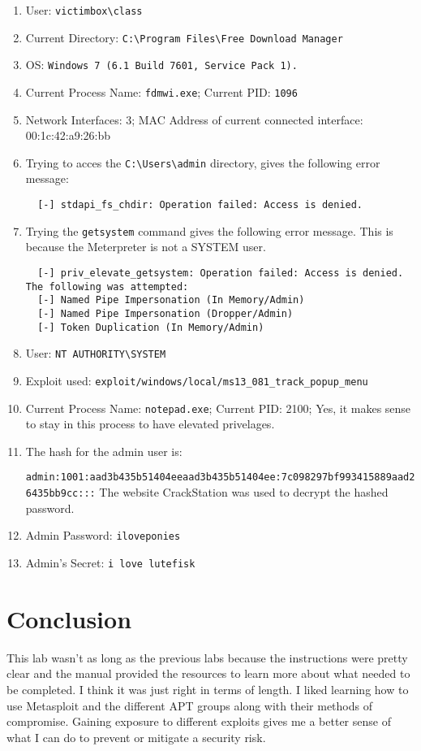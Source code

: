\documentclass[11pt]{article}
\begin{document}
\begin{enumerate}
  it does not require authentication, all system files are revealable, any file is modifiable, and
  the attacker can render the system unavailable.~\cite{cve}
  \item User: \verb|victimbox\class|
  \item Current Directory: \verb|C:\Program Files\Free Download Manager|
  \item OS: \verb|Windows 7 (6.1 Build 7601, Service Pack 1).|
  \item Current Process Name: \verb|fdmwi.exe|; Current PID: \verb|1096|
  \item Network Interfaces: 3; MAC Address of current connected interface: 00:1c:42:a9:26:bb
  \item Trying to acces the \verb|C:\Users\admin| directory, gives the following error message:
  \begin{verbatim}
  [-] stdapi_fs_chdir: Operation failed: Access is denied.
  \end{verbatim}
  \item Trying the \verb|getsystem| command gives the following error message. This is because the Meterpreter
  is not a SYSTEM user.
  \begin{verbatim}
  [-] priv_elevate_getsystem: Operation failed: Access is denied. The following was attempted:
  [-] Named Pipe Impersonation (In Memory/Admin)
  [-] Named Pipe Impersonation (Dropper/Admin)
  [-] Token Duplication (In Memory/Admin)
  \end{verbatim}
  \item User: \verb|NT AUTHORITY\SYSTEM|
  \item Exploit used: \verb|exploit/windows/local/ms13_081_track_popup_menu|
  \item Current Process Name: \verb|notepad.exe|; Current PID: 2100; Yes, it makes sense to 
  stay in this process to have elevated privelages.
  \item The hash for the admin user is:

  \verb|admin:1001:aad3b435b51404eeaad3b435b51404ee:7c098297bf993415889aad26435bb9cc:::|
  The website CrackStation was used to decrypt the hashed password.~\cite{crack}
  \item Admin Password: \verb|iloveponies|
  \item Admin's Secret: \verb|i love lutefisk|
\end{enumerate}
\newpage
\section*{Conclusion}
\label{sec:conclusion}
This lab wasn't as long as the previous labs because the instructions were pretty clear
and the manual provided the resources to learn more about what needed to be completed.
I think it was just right in terms of length. I liked learning how to use Metasploit and the
different APT groups along with their methods of compromise. Gaining exposure to different
exploits gives me a better sense of what I can do to prevent or mitigate a security risk.

\newpage
\nocite{*}


\end{document}
